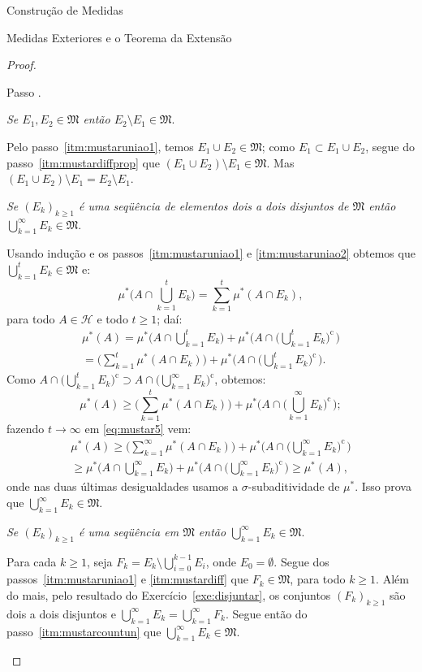 \documentclass[oneside,final,11pt]{amsbook}
\newcommand{\compl}{\mathrm c}
\newcounter{contastep}
\newenvironment{stepindent}{\setcounter{contastep}{1}
\begin{list} {Passo \arabic{contastep}.}
{\usecounter{contastep}
\setlength{\leftmargin}{10pt}
\setlength{\rightmargin}{10pt}
\setlength{\labelsep}{5pt}
\setlength{\itemsep}{10pt}
\setlength{\topsep}{10pt}}}
{\end{list}}
\theoremstyle{remark}\newtheorem{exercise}{Exercício}[chapter]
\theoremstyle{remark}\newtheorem{*exercise}[exercise]{\hbox to 0pt{\hskip 0pt minus 1fil*}Exercício}
\theoremstyle{definition}\newtheorem{exdefin}{Definição}[chapter]
\theoremstyle{plain}\newtheorem{teo}{Teorema}[section]
\theoremstyle{plain}\newtheorem{lem}[teo]{Lema}
\theoremstyle{plain}\newtheorem{prop}[teo]{Proposição}
\theoremstyle{plain}\newtheorem{cor}[teo]{Corolário}
\theoremstyle{definition}\newtheorem{defin}[teo]{Definição}
\theoremstyle{remark}\newtheorem{rem}[teo]{Observação}
\theoremstyle{definition}\newtheorem{notation}[teo]{Notação}
\theoremstyle{definition}\newtheorem{convention}[teo]{Convenção}
\theoremstyle{definition}\newtheorem{example}[teo]{Exemplo}
\numberwithin{section}{chapter}
\numberwithin{equation}{section}
\begin{document}
\begin{chapter}{Construção de Medidas}
\begin{section}{Medidas Exteriores e o Teorema da Extensão}
\begin{proof}
\begin{stepindent}
\item\label{itm:mustardiff}
{\em Se $E_1,E_2\in\mathfrak M$ então $E_2\setminus E_1\in\mathfrak M$}.

Pelo passo~\ref{itm:mustaruniao1}, temos $E_1\cup E_2\in\mathfrak M$;
como $E_1\subset E_1\cup E_2$, segue do passo~\ref{itm:mustardiffprop} que
$(E_1\cup E_2)\setminus E_1\in\mathfrak M$. Mas $(E_1\cup E_2)\setminus E_1=E_2\setminus E_1$.

\item\label{itm:mustarcountun} {\em Se $(E_k)_{k\ge1}$ é uma seqüência de elementos dois a dois disjuntos de
$\mathfrak M$ então $\bigcup_{k=1}^\infty E_k\in\mathfrak M$}.

Usando indução e os passos~\ref{itm:mustaruniao1} e \ref{itm:mustaruniao2} obtemos
que $\bigcup_{k=1}^tE_k\in\mathfrak M$ e:
\[\mu^*\Big(A\cap\bigcup_{k=1}^tE_k\Big)=\sum_{k=1}^t\mu^*(A\cap E_k),\]
para todo $A\in\mathcal H$ e todo $t\ge1$; daí:
\begin{multline*}
\mu^*(A)=\mu^*\Big(A\cap\bigcup_{k=1}^tE_k\Big)+\mu^*\Big(A\cap\Big(\bigcup_{k=1}^tE_k\Big)^{\!\compl\,}\Big)\\
=\Big(\sum_{k=1}^t\mu^*(A\cap E_k)\Big)+\mu^*\Big(A\cap\Big(\bigcup_{k=1}^tE_k\Big)^{\!\compl\,}\Big).
\end{multline*}
Como $A\cap\big(\bigcup_{k=1}^tE_k\big)^\compl\supset A\cap\big(\bigcup_{k=1}^\infty E_k\big)^\compl$, obtemos:
\begin{equation}\label{eq:mustar5}
\mu^*(A)\ge\Big(\sum_{k=1}^t\mu^*(A\cap E_k)\Big)+\mu^*\Big(A\cap\Big(\bigcup_{k=1}^\infty E_k\Big)^{\!\compl\,}\Big);
\end{equation}
fazendo $t\to\infty$ em \eqref{eq:mustar5} vem:
\begin{multline}\label{eq:mustar6}
\mu^*(A)\ge\Big(\sum_{k=1}^\infty\mu^*(A\cap E_k)\Big)+\mu^*\Big(A\cap\Big(\bigcup_{k=1}^\infty E_k\Big)^{\!\compl\,}\Big)\\
\ge\mu^*\Big(A\cap\bigcup_{k=1}^\infty E_k\Big)+\mu^*\Big(A\cap\Big(\bigcup_{k=1}^\infty E_k\Big)^{\!\compl\,}\Big)\ge\mu^*(A),
\end{multline}
onde nas duas últimas desigualdades usamos a $\sigma$-subaditividade de $\mu^*$.
Isso prova que $\bigcup_{k=1}^\infty E_k\in\mathfrak M$.

\item\label{itm:mustarcountunn}
{\em Se $(E_k)_{k\ge1}$ é uma seqüência em $\mathfrak M$ então $\bigcup_{k=1}^\infty E_k\in\mathfrak M$}.

Para cada $k\ge1$, seja $F_k=E_k\setminus\bigcup_{i=0}^{k-1}E_i$, onde $E_0=\emptyset$.
Segue dos passos~\ref{itm:mustaruniao1} e \ref{itm:mustardiff} que $F_k\in\mathfrak M$,
para todo $k\ge1$. Além do mais, pelo resultado do Exercício~\ref{exe:disjuntar},
os conjuntos $(F_k)_{k\ge1}$ são dois a dois disjuntos e $\bigcup_{k=1}^\infty E_k=
\bigcup_{k=1}^\infty F_k$. Segue então do passo~\ref{itm:mustarcountun} que
$\bigcup_{k=1}^\infty E_k\in\mathfrak M$.


\end{stepindent}
\end{proof}
\end{section}
\end{chapter}
\end{document}
